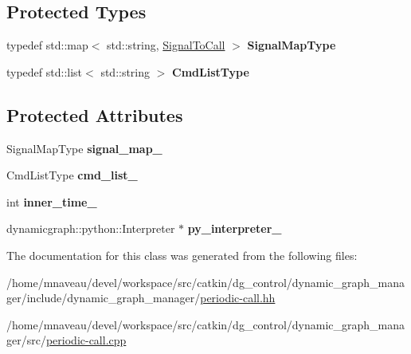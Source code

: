 \subsection*{Protected Types}
\begin{DoxyCompactItemize}
\item 
typedef std\+::map$<$ std\+::string, \hyperlink{structdynamic__graph_1_1PeriodicCall_1_1SignalToCall}{Signal\+To\+Call} $>$ {\bfseries Signal\+Map\+Type}\hypertarget{classdynamic__graph_1_1PeriodicCall_acf4cd14a78523d6612d4679cb5a67d8b}{}\label{classdynamic__graph_1_1PeriodicCall_acf4cd14a78523d6612d4679cb5a67d8b}

\item 
typedef std\+::list$<$ std\+::string $>$ {\bfseries Cmd\+List\+Type}\hypertarget{classdynamic__graph_1_1PeriodicCall_a9f1b6479e369706876d3f9a145b4f621}{}\label{classdynamic__graph_1_1PeriodicCall_a9f1b6479e369706876d3f9a145b4f621}

\end{DoxyCompactItemize}
\subsection*{Protected Attributes}
\begin{DoxyCompactItemize}
\item 
Signal\+Map\+Type {\bfseries signal\+\_\+map\+\_\+}\hypertarget{classdynamic__graph_1_1PeriodicCall_a6f63edf8adc5323c4e2b5dbe5bec1fb1}{}\label{classdynamic__graph_1_1PeriodicCall_a6f63edf8adc5323c4e2b5dbe5bec1fb1}

\item 
Cmd\+List\+Type {\bfseries cmd\+\_\+list\+\_\+}\hypertarget{classdynamic__graph_1_1PeriodicCall_a7d82343533f1913b1950589da0a6e70a}{}\label{classdynamic__graph_1_1PeriodicCall_a7d82343533f1913b1950589da0a6e70a}

\item 
int {\bfseries inner\+\_\+time\+\_\+}\hypertarget{classdynamic__graph_1_1PeriodicCall_a5a7e82f4cf00a6a6e1d86521da303b0d}{}\label{classdynamic__graph_1_1PeriodicCall_a5a7e82f4cf00a6a6e1d86521da303b0d}

\item 
dynamicgraph\+::python\+::\+Interpreter $\ast$ {\bfseries py\+\_\+interpreter\+\_\+}\hypertarget{classdynamic__graph_1_1PeriodicCall_a844af38083b3d1aaa8dedbb5ba35ab1f}{}\label{classdynamic__graph_1_1PeriodicCall_a844af38083b3d1aaa8dedbb5ba35ab1f}

\end{DoxyCompactItemize}


The documentation for this class was generated from the following files\+:\begin{DoxyCompactItemize}
\item 
/home/mnaveau/devel/workspace/src/catkin/dg\+\_\+control/dynamic\+\_\+graph\+\_\+manager/include/dynamic\+\_\+graph\+\_\+manager/\hyperlink{periodic-call_8hh}{periodic-\/call.\+hh}\item 
/home/mnaveau/devel/workspace/src/catkin/dg\+\_\+control/dynamic\+\_\+graph\+\_\+manager/src/\hyperlink{periodic-call_8cpp}{periodic-\/call.\+cpp}\end{DoxyCompactItemize}
